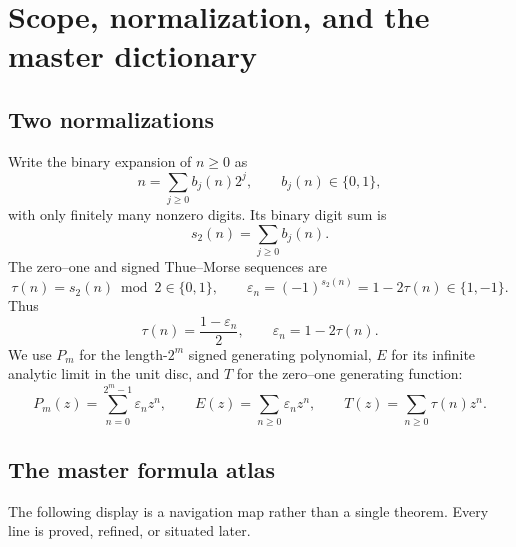 \documentclass[11pt,oneside]{article}
\theoremstyle{definition}
\theoremstyle{remark}
\newcommand{\bitsum}{s_2}
\newcommand{\eps}{\varepsilon}
\begin{document}
\tableofcontents
\clearpage

\section{Scope, normalization, and the master dictionary}

\subsection{Two normalizations}

Write the binary expansion of $n\ge 0$ as
\[
  n=\sum_{j\ge 0}b_j(n)2^j,
  \qquad b_j(n)\in\{0,1\},
\]
with only finitely many nonzero digits.  Its binary digit sum is
\[
  \bitsum(n)=\sum_{j\ge 0}b_j(n).
\]
The zero--one and signed Thue--Morse sequences are
\begin{equation}\label{p3:eq:two-normalizations}
  \tau(n)=\bitsum(n)\bmod 2\in\{0,1\},
  \qquad
  \eps_n=(-1)^{\bitsum(n)}=1-2\tau(n)\in\{1,-1\}.
\end{equation}
Thus
\begin{equation}\label{p3:eq:tau-eps-conversion}
  \tau(n)=\frac{1-\eps_n}{2},
  \qquad
  \eps_n=1-2\tau(n).
\end{equation}
We use $P_m$ for the length-$2^m$ signed generating polynomial,
$E$ for its infinite analytic limit in the unit disc, and $T$ for the
zero--one generating function:
\begin{equation}\label{p3:eq:master-generating-notation}
  P_m(z)=\sum_{n=0}^{2^m-1}\eps_nz^n,
  \qquad
  E(z)=\sum_{n\ge 0}\eps_nz^n,
  \qquad
  T(z)=\sum_{n\ge 0}\tau(n)z^n.
\end{equation}

\subsection{The master formula atlas}

The following display is a navigation map rather than a single theorem.
Every line is proved, refined, or situated later.
\end{document}
